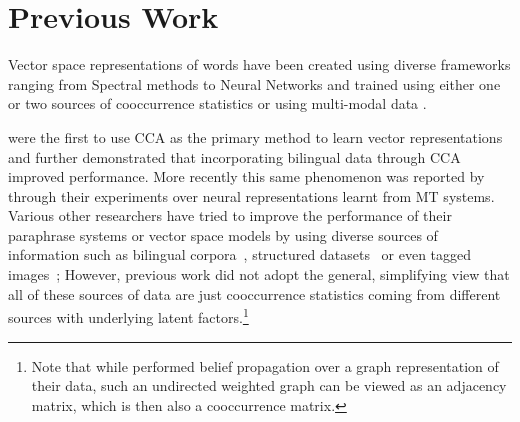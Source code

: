 \documentclass[11pt]{article}
\newcommand{\remove}[1]{}
\begin{document}
\section{Previous Work}
\label{sec:previouswork}
Vector space representations of words have been created using diverse
 frameworks ranging from Spectral methods
 \cite{dhillon2011multi,dhillon2012two}
 to Neural Networks
 \cite{mikolov2013linguistic,collobert2013word}
 and trained using either one
 \cite{pennington2014glove}
 or two sources of cooccurrence statistics
 \cite{zou2013bilingual,faruqui2014improving,bansal2014tailoring,levy2014dependency}
 or using multi-modal data
 \cite{felix2014learning,bruni2012distributional}.
 
 were the first to use
CCA as the primary method to learn vector representations and
 further demonstrated that incorporating bilingual
data through CCA improved performance. More recently this same
phenomenon was reported by  through their
experiments over neural representations learnt from MT systems.
Various other researchers have tried to improve the performance of
their paraphrase systems or vector space models by using diverse
sources of information such as bilingual
corpora~\cite{bannard2005paraphrasing,Huang2012Improving,zou2013bilingual},
structured datasets~\cite{yu2014improving,faruqui2014retrofitting} or
even tagged images~\cite{bruni2012distributional}; \remove{The
  intuitive reason that using multiple sources of data improves
  performance is that the views complement each other. For example it
  was mentioned in \cite{ganitkevitch2013ppdb} that monolingual data
  can't distinguish between antonyms but bilingual data can. And
  bilingual data confounds words that occur in the same sentence but
  monolingual data can distinguish them based on their context.}
However, previous work did not adopt the general, simplifying view
that all of these sources of data are just cooccurrence statistics
coming from different sources with underlying latent
factors.\footnote{Note that while 
  performed belief propagation over a graph representation of their
  data, such an undirected weighted graph can be viewed as an
  adjacency matrix, which is then also a cooccurrence matrix.}
\end{document}
